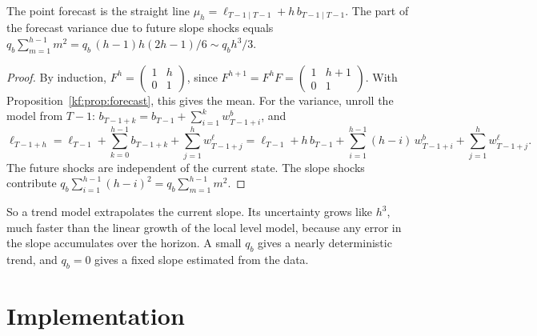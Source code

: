 \begin{proposition}\label{kf:prop:llt}
The point forecast is the straight line $\mu_h=\ell_{T-1\mid T-1}+h\,b_{T-1\mid T-1}$. The
part of the forecast variance due to future slope shocks equals
$q_b\sum_{m=1}^{h-1}m^2=q_b\,(h-1)h(2h-1)/6\sim q_bh^3/3$.
\end{proposition}
\begin{proof}
By induction, $F^h=\begin{pmatrix}1&h\\0&1\end{pmatrix}$, since
$F^{h+1}=F^hF=\begin{pmatrix}1&h+1\\0&1\end{pmatrix}$. With
Proposition~\ref{kf:prop:forecast}, this gives the mean. For the variance, unroll the model from $T-1$:
$b_{T-1+k}=b_{T-1}+\sum_{i=1}^{k}w^b_{T-1+i}$, and
\[
  \ell_{T-1+h} = \ell_{T-1} + \sum_{k=0}^{h-1} b_{T-1+k} + \sum_{j=1}^{h} w^\ell_{T-1+j}
               = \ell_{T-1} + h\,b_{T-1} + \sum_{i=1}^{h-1}(h-i)\,w^b_{T-1+i} + \sum_{j=1}^{h}w^\ell_{T-1+j}.
\]
The future shocks are independent of the current state. The slope shocks contribute
$q_b\sum_{i=1}^{h-1}(h-i)^2=q_b\sum_{m=1}^{h-1}m^2$.
\end{proof}

So a trend model extrapolates the current slope. Its uncertainty grows like $h^3$,
much faster than the linear growth of the local level model, because any
error in the slope accumulates over the horizon. A small $q_b$ gives a nearly
deterministic trend, and $q_b=0$ gives a fixed slope estimated from the data.

\section{Implementation}

